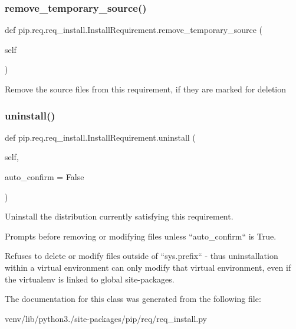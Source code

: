 \subsubsection{\texorpdfstring{remove\+\_\+temporary\+\_\+source()}{remove\_temporary\_source()}}
{\footnotesize\ttfamily def pip.\+req.\+req\+\_\+install.\+Install\+Requirement.\+remove\+\_\+temporary\+\_\+source (\begin{DoxyParamCaption}\item[{}]{self }\end{DoxyParamCaption})}

\begin{DoxyVerb}Remove the source files from this requirement, if they are marked
for deletion\end{DoxyVerb}
 \mbox{\label{classpip_1_1req_1_1req__install_1_1_install_requirement_ac9b9fe81c5d6859da24059efb1727ef6}} 
\subsubsection{\texorpdfstring{uninstall()}{uninstall()}}
{\footnotesize\ttfamily def pip.\+req.\+req\+\_\+install.\+Install\+Requirement.\+uninstall (\begin{DoxyParamCaption}\item[{}]{self,  }\item[{}]{auto\+\_\+confirm = {\ttfamily False} }\end{DoxyParamCaption})}

\begin{DoxyVerb}Uninstall the distribution currently satisfying this requirement.

Prompts before removing or modifying files unless
``auto_confirm`` is True.

Refuses to delete or modify files outside of ``sys.prefix`` -
thus uninstallation within a virtual environment can only
modify that virtual environment, even if the virtualenv is
linked to global site-packages.\end{DoxyVerb}
 

The documentation for this class was generated from the following file\+:\begin{DoxyCompactItemize}
\item 
venv/lib/python3./site-\/packages/pip/req/req\+\_\+install.\+py\end{DoxyCompactItemize}
